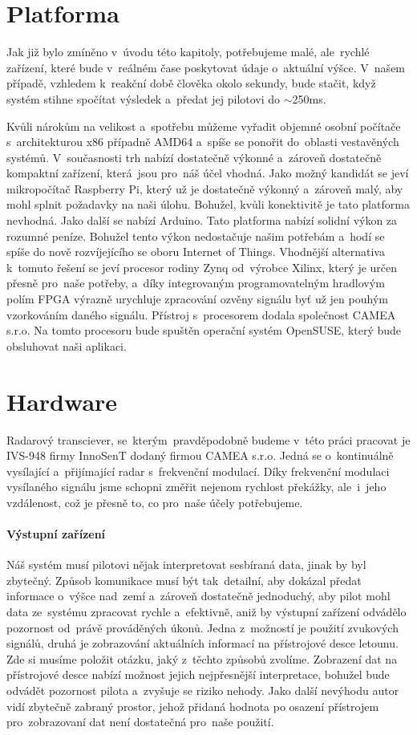 	\section{Platforma}\label{navrhReseni::platforma}
		Jak již bylo zmíněno v~úvodu této kapitoly, potřebujeme malé, ale~rychlé zařízení, které bude v~reálném čase poskytovat údaje o~aktuální výšce. V~našem případě, vzhledem k~reakční době člověka okolo sekundy, bude stačit, když systém stihne spočítat výsledek a~předat jej pilotovi do $\sim$250ms.\par
		
		Kvůli nárokům na velikost a~spotřebu můžeme vyřadit objemné osobní počítače s~architekturou x86 případně AMD64 a~spíše se ponořit do~oblasti vestavěných systémů. V~současnosti trh nabízí dostatečně výkonné a~zároveň dostatečně kompaktní zařízení, která~jsou pro~náš účel vhodná. Jako možný kandidát se jeví mikropočítač Raspberry Pi, který už je dostatečně výkonný a~zároveň malý, aby mohl splnit požadavky na naši úlohu. Bohužel, kvůli konektivitě je tato platforma nevhodná. Jako další se nabízí Arduino. Tato platforma nabízí solidní výkon za rozumné peníze. Bohužel tento výkon nedostačuje našim potřebám a~hodí se spíše do nově rozvíjejícího se oboru Internet of Things. Vhodnější alternativa k~tomuto řešení se jeví procesor rodiny Zynq od~výrobce Xilinx, který je určen přesně pro~naše potřeby, a~díky integrovaným programovatelným hradlovým polím FPGA výrazně urychluje zpracování ozvěny signálu byť už jen pouhým vzorkováním daného signálu. Přístroj s~procesorem dodala společnost CAMEA s.r.o. Na tomto procesoru bude spuštěn operační systém OpenSUSE, který bude obsluhovat naši aplikaci.
		
	\section{Hardware}
		Radarový transciever, se~kterým~pravděpodobně budeme v~této práci pracovat je IVS-948 firmy InnoSenT dodaný firmou CAMEA s.r.o. Jedná se o~kontinuálně vysílající a~přijímající radar s~frekvenční modulací. Díky frekvenční modulaci vysílaného signálu jsme schopni změřit nejenom rychlost překážky, ale~i~jeho vzdálenost, což je přesně to, co pro~naše účely potřebujeme.
	
	\paragraph{Výstupní zařízení}
		Náš systém musí pilotovi nějak interpretovat sesbíraná data, jinak by byl zbytečný. Způsob komunikace musí být tak~detailní, aby dokázal předat informace o~výšce nad~zemí a~zároveň dostatečně jednoduchý, aby pilot mohl data ze~systému zpracovat rychle a~efektivně, aniž by výstupní zařízení odvádělo pozornost od~právě prováděných úkonů. Jedna z~možností je použití zvukových signálů, druhá je zobrazování aktuálních informací na přístrojové desce letounu. Zde si musíme položit otázku, jaký z~těchto způsobů zvolíme. Zobrazení dat na přístrojové desce nabízí možnost jejich nejpřesnější interpretace, bohužel bude odvádět pozornost pilota a~zvyšuje se riziko nehody. Jako další nevýhodu autor vidí zbytečně zabraný prostor, jehož přidaná hodnota po osazení přístrojem pro~zobrazovaní dat není dostatečná pro~naše použití. 
			
